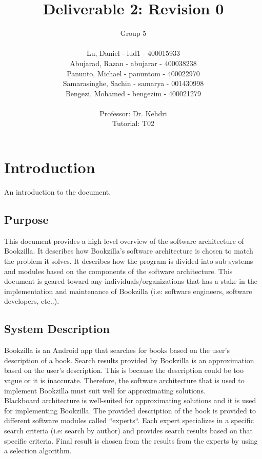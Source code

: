 \documentclass[12pt]{article}
\title{Deliverable 2: Revision 0}
\author{Group 5 \\
		\\ Lu, Daniel - lud1  - 400015933
		\\ Abujarad, Razan - abujarar  - 400038238
		\\ Panunto, Michael - panuntom - 400022970
		\\ Samarasinghe, Sachin - samarya - 001430998
		\\ Bengezi, Mohamed - bengezim - 400021279 \\
		\\ Professor: Dr. Kehdri
		\\ Tutorial: T02}
\begin{document}
\setlength{\arrayrulewidth}{1.5pt}

\maketitle

\newpage

{\centering
  \tableofcontents\par
}
\newpage

\section{Introduction}
\label{sec:introduction}

An introduction to the document.

\subsection{Purpose}
This document provides a high level overview of the software architecture of Bookzilla. It describes how Bookzilla's software architecture is chosen to match the problem it solves. It describes how the program is divided into sub-systems and modules based on the components of the software architecture. This document is geared toward any individuals/organizations that has a stake in the implementation and maintenance of Bookzilla (i.e: software engineers, software developers, etc..).

\subsection{System Description}
Bookzilla is an Android app that searches for books based on the user's description of a book. Search results provided by Bookzilla is an approximation based on the user's description. This is because the description could be too vague or it is inaccurate. Therefore, the software architecture that is used to implement Bookzilla must suit well for approximating solutions.\\

\noindent Blackboard architecture is well-suited for approximating solutions and it is used for implementing Bookzilla. The provided description of the book is provided to different software modules called ``experts``. Each expert specializes in a specific search criteria (i.e: search by author) and provides search results based on that specific criteria. Final result is chosen from the results from the experts by using a selection algorithm.
\end{document}
